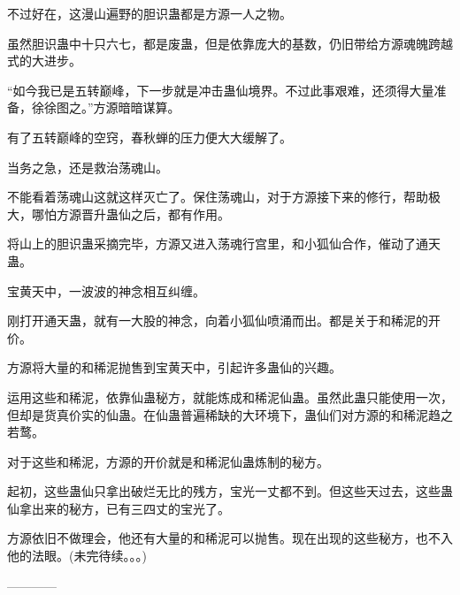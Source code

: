 \begin{this_body}
不过好在，这漫山遍野的胆识蛊都是方源一人之物。

虽然胆识蛊中十只六七，都是废蛊，但是依靠庞大的基数，仍旧带给方源魂魄跨越式的大进步。

“如今我已是五转巅峰，下一步就是冲击蛊仙境界。不过此事艰难，还须得大量准备，徐徐图之。”方源暗暗谋算。

有了五转巅峰的空窍，春秋蝉的压力便大大缓解了。

当务之急，还是救治荡魂山。

不能看着荡魂山这就这样灭亡了。保住荡魂山，对于方源接下来的修行，帮助极大，哪怕方源晋升蛊仙之后，都有作用。

将山上的胆识蛊采摘完毕，方源又进入荡魂行宫里，和小狐仙合作，催动了通天蛊。

宝黄天中，一波波的神念相互纠缠。

刚打开通天蛊，就有一大股的神念，向着小狐仙喷涌而出。都是关于和稀泥的开价。

方源将大量的和稀泥抛售到宝黄天中，引起许多蛊仙的兴趣。

运用这些和稀泥，依靠仙蛊秘方，就能炼成和稀泥仙蛊。虽然此蛊只能使用一次，但却是货真价实的仙蛊。在仙蛊普遍稀缺的大环境下，蛊仙们对方源的和稀泥趋之若鹜。

对于这些和稀泥，方源的开价就是和稀泥仙蛊炼制的秘方。

起初，这些蛊仙只拿出破烂无比的残方，宝光一丈都不到。但这些天过去，这些蛊仙拿出来的秘方，已有三四丈的宝光了。

方源依旧不做理会，他还有大量的和稀泥可以抛售。现在出现的这些秘方，也不入他的法眼。(未完待续。。。)

------------

\end{this_body}

